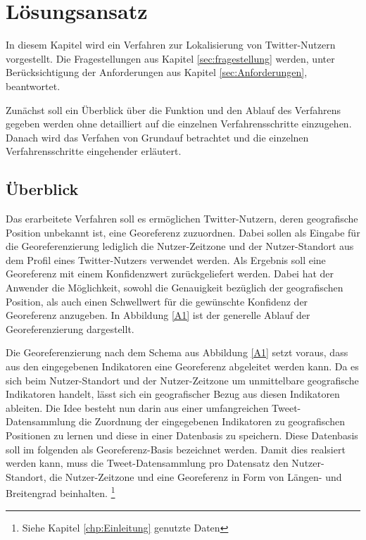 \chapter{Lösungsansatz} \label{chp:Loesungsansatz}
In diesem Kapitel wird ein Verfahren zur Lokalisierung von Twitter-Nutzern vorgestellt.
Die Fragestellungen aus Kapitel \ref{sec:fragestellung} werden, unter Berücksichtigung der Anforderungen aus Kapitel \ref{sec:Anforderungen}, beantwortet.  

Zunächst soll ein Überblick über die Funktion und den Ablauf des Verfahrens gegeben werden ohne detailliert auf die einzelnen Verfahrensschritte einzugehen.
Danach wird das Verfahen von Grundauf betrachtet und die einzelnen Verfahrensschritte eingehender erläutert. 

	\section{Überblick} 

	Das erarbeitete Verfahren soll es ermöglichen Twitter-Nutzern, deren geografische Position unbekannt ist, eine Georeferenz zuzuordnen.
	Dabei sollen als Eingabe für die Georeferenzierung lediglich die Nutzer-Zeitzone und der Nutzer-Standort aus dem Profil eines Twitter-Nutzers verwendet werden.
	Als Ergebnis soll eine Georeferenz mit einem Konfidenzwert zurückgeliefert werden. 
	Dabei hat der Anwender die Möglichkeit, sowohl die Genauigkeit bezüglich der geografischen Position, als auch einen Schwellwert für die gewünschte Konfidenz der Georeferenz anzugeben.
	In Abbildung \ref{A1} ist der generelle Ablauf der Georeferenzierung dargestellt. 
	\label{A1} 

	Die Georeferenzierung nach dem Schema aus Abbildung \ref{A1} setzt voraus, dass aus den eingegebenen Indikatoren eine Georeferenz abgeleitet werden kann.
	Da es sich beim Nutzer-Standort und der Nutzer-Zeitzone um unmittelbare geografische Indikatoren handelt, lässt sich ein geografischer Bezug aus diesen Indikatoren ableiten.      
	Die Idee besteht nun darin aus einer umfangreichen Tweet-Datensammlung die Zuordnung der eingegebenen Indikatoren zu geografischen Positionen zu lernen und diese in einer Datenbasis zu speichern.
	Diese Datenbasis soll im folgenden als Georeferenz-Basis bezeichnet werden.
	Damit dies realsiert werden kann, muss die Tweet-Datensammlung pro Datensatz den Nutzer-Standort, die Nutzer-Zeitzone und eine Georeferenz in Form von Längen- und Breitengrad beinhalten.  \footnote{Siehe Kapitel \ref{chp:Einleitung} genutzte Daten}

